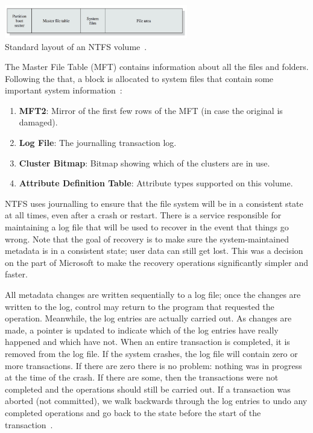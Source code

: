 \documentclass[a4paper]{report}
\begin{document}
\begin{center}
	\includegraphics[width=0.6\textwidth]{images/ntfs-volume.png}\\
	Standard layout of an NTFS volume~\cite{osi}.
\end{center}

The Master File Table (MFT) contains information about all the files and folders. Following the that, a block is allocated to system files that contain some important system information~\cite{osi}:

\begin{enumerate}
	\item \textbf{MFT2}: Mirror of the first few rows of the MFT (in case the original is damaged).
	\item \textbf{Log File}: The journalling transaction log.
	\item \textbf{Cluster Bitmap}: Bitmap showing which of the clusters are in use.
	\item \textbf{Attribute Definition Table}: Attribute types supported on this volume.
\end{enumerate}

NTFS uses journalling to ensure that the file system will be in a consistent state at all times, even after a crash or restart. There is a service responsible for maintaining a log file that will be used to recover in the event that things go wrong.  Note that the goal of recovery is to make sure the system-maintained metadata is in a consistent state; user data can still get lost. This was a decision on the part of Microsoft to make the recovery operations significantly simpler and faster.

All metadata changes are written sequentially to a log file; once the changes are written to the log, control may return to the program that requested the operation. Meanwhile, the log entries are actually carried out. As changes are made, a pointer is updated to indicate which of the log entries have really happened and which have not. When an entire transaction is completed, it is removed from the log file. If the system crashes, the log file will contain zero or more transactions. If there are zero there is no problem: nothing was in progress at the time of the crash. If there are some, then the transactions were not completed and the operations should still be carried out. If a transaction was aborted (not committed), we walk backwards through the log entries to undo any completed operations and go back to the state before the start of the transaction~\cite{osc}.
\end{document}

